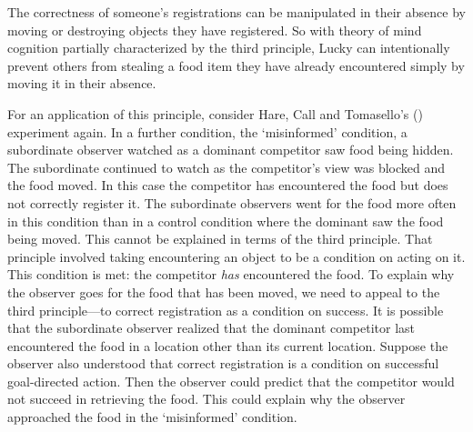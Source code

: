 \documentclass[12pt,\papersize]{extarticle}
\begin{document}
The correctness of someone’s registrations can be manipulated in their absence by moving or destroying objects they have registered.  So with theory of mind cognition partially characterized by the third principle, Lucky can intentionally prevent others from stealing a food item they have already encountered simply by moving it in their absence.

For an application of this principle, consider Hare, Call and Tomasello’s (\citeyear[]{en_1545}) experiment again.  In a further condition, the `misinformed' condition, a subordinate observer watched as a dominant competitor saw food being hidden.  The subordinate continued to watch as the competitor’s view was blocked and the food moved.  In this case the competitor has encountered the food but does not correctly register it.  The subordinate observers went for the food more often in this condition than in a control condition where the dominant saw the food being moved.  This cannot be explained in terms of the third principle.  That principle involved taking encountering an object to be a condition on acting on it.  This condition is met: the competitor \textit{has} encountered the food.  To explain why the observer goes for the food that has been moved, we need to appeal to the third principle—to correct registration as a condition on success.  It is possible that the subordinate observer realized that the dominant competitor last encountered the food in a location other than its current location.  Suppose the observer also understood that correct registration is a condition on successful goal-directed action.  Then the observer could predict that the competitor would not succeed in retrieving the food.  This could explain why the observer approached the food in the `misinformed' condition.  
\end{document}
